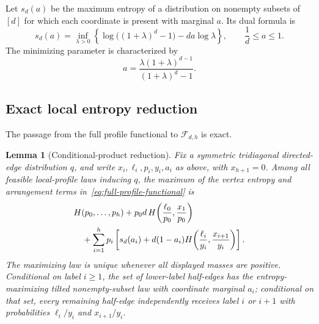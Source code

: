 \documentclass[11pt]{amsart}
\newtheorem{lemma}[theorem]{Lemma}
\theoremstyle{definition}
\newcommand{\Fcal}{\mathcal F}
\begin{document}
Let $s_d(a)$ be the maximum entropy of a distribution on nonempty subsets of $[d]$ for which each coordinate is present with marginal $a$.  Its dual formula is
\begin{equation}\label{eq:sd}
 s_d(a)=\inf_{\lambda>0}
 \left\{
 \log\bigl((1+\lambda)^d-1\bigr)-da\log\lambda
 \right\},
 \qquad \frac1d\le a\le1.
\end{equation}
The minimizing parameter is characterized by
\begin{equation}\label{eq:sd-marginal}
 a=\frac{\lambda(1+\lambda)^{d-1}}{(1+\lambda)^d-1}.
\end{equation}


\subsection{Exact local entropy reduction}\label{sec:compact-reduction}
The passage from the full profile functional to $\Fcal_{d,h}$ is exact.

\begin{lemma}[Conditional-product reduction]\label{lem:compact-reduction}
Fix a symmetric tridiagonal directed-edge distribution $q$, and write $x_i,\ell_i,p_i,y_i,a_i$ as above, with $x_{h+1}=0$.  Among all feasible local-profile laws inducing $q$, the maximum of the vertex entropy and arrangement terms in~\eqref{eq:full-profile-functional} is
\begin{align}
 &H(p_0,\ldots,p_h)
 +p_0 d\,H\!\left(\frac{\ell_0}{p_0},\frac{x_1}{p_0}\right)\notag\\
 &\quad+\sum_{i=1}^h p_i\left[
 s_d(a_i)+d(1-a_i)
 H\!\left(\frac{\ell_i}{y_i},\frac{x_{i+1}}{y_i}\right)
 \right].\label{eq:local-reduction}
\end{align}
The maximizing law is unique whenever all displayed masses are positive.  Conditional on label $i\ge1$, the set of lower-label half-edges has the entropy-maximizing tilted nonempty-subset law with coordinate marginal $a_i$; conditional on that set, every remaining half-edge independently receives label $i$ or $i+1$ with probabilities $\ell_i/y_i$ and $x_{i+1}/y_i$.
\end{lemma}
\end{document}

